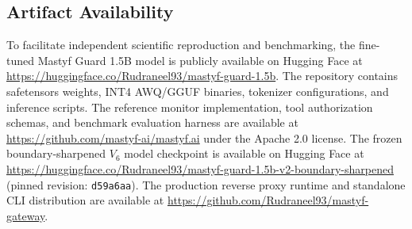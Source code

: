 \documentclass[10pt,journal,compsoc]{IEEEtran}
\begin{document}
\subsection{Artifact Availability}
To facilitate independent scientific reproduction and benchmarking, the fine-tuned Mastyf Guard 1.5B model is publicly available on Hugging Face at \url{https://huggingface.co/Rudraneel93/mastyf-guard-1.5b}. The repository contains safetensors weights, INT4 AWQ/GGUF binaries, tokenizer configurations, and inference scripts. The reference monitor implementation, tool authorization schemas, and benchmark evaluation harness are available at \url{https://github.com/mastyf-ai/mastyf.ai} under the Apache 2.0 license. The frozen boundary-sharpened $V_6$ model checkpoint is available on Hugging Face at \url{https://huggingface.co/Rudraneel93/mastyf-guard-1.5b-v2-boundary-sharpened} (pinned revision: \texttt{d59a6aa}). The production reverse proxy runtime and standalone CLI distribution are available at \url{https://github.com/Rudraneel93/mastyf-gateway}.

\clearpage
\nocite{*}


\end{document}
